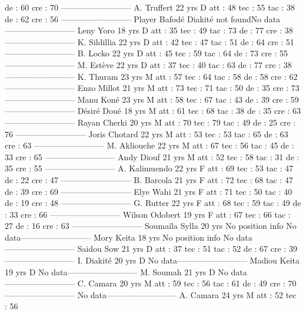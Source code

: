  de : 60 
 cre : 70 
--------------------------
A. Truffert  22 yrs 
D 
 att : 48 
 tec : 55 
 tac : 38 
 de : 62 
 cre : 56 
--------------------------
Player Bafodé Diakité not foundNo data--------------------------
Leny Yoro  18 yrs 
D 
 att : 35 
 tec : 49 
 tac : 73 
 de : 77 
 cre : 38 
--------------------------
K. Sildillia  22 yrs 
D 
 att : 42 
 tec : 47 
 tac : 51 
 de : 64 
 cre : 51 
--------------------------
B. Locko  22 yrs 
D 
 att : 45 
 tec : 59 
 tac : 64 
 de : 73 
 cre : 55 
--------------------------
M. Estève  22 yrs 
D 
 att : 37 
 tec : 40 
 tac : 63 
 de : 77 
 cre : 38 
--------------------------
K. Thuram  23 yrs 
M 
 att : 57 
 tec : 64 
 tac : 58 
 de : 58 
 cre : 62 
--------------------------
Enzo Millot  21 yrs 
M 
 att : 73 
 tec : 71 
 tac : 50 
 de : 35 
 cre : 73 
--------------------------
Manu Koné  23 yrs 
M 
 att : 58 
 tec : 67 
 tac : 43 
 de : 39 
 cre : 59 
--------------------------
Désiré Doué  18 yrs 
M 
 att : 61 
 tec : 68 
 tac : 38 
 de : 35 
 cre : 63 
--------------------------
Rayan Cherki  20 yrs 
M 
 att : 70 
 tec : 79 
 tac : 49 
 de : 25 
 cre : 76 
--------------------------
Joris Chotard  22 yrs 
M 
 att : 53 
 tec : 53 
 tac : 65 
 de : 63 
 cre : 63 
--------------------------
M. Akliouche  22 yrs 
M 
 att : 67 
 tec : 56 
 tac : 45 
 de : 33 
 cre : 65 
--------------------------
Andy Diouf  21 yrs 
M 
 att : 52 
 tec : 58 
 tac : 31 
 de : 35 
 cre : 55 
--------------------------
A. Kalimuendo  22 yrs 
F 
 att : 69 
 tec : 53 
 tac : 47 
 de : 22 
 cre : 47 
--------------------------
B. Barcola  21 yrs 
F 
 att : 72 
 tec : 68 
 tac : 47 
 de : 39 
 cre : 69 
--------------------------
Elye Wahi  21 yrs 
F 
 att : 71 
 tec : 50 
 tac : 40 
 de : 19 
 cre : 48 
--------------------------
G. Rutter  22 yrs 
F 
 att : 68 
 tec : 59 
 tac : 49 
 de : 33 
 cre : 66 
--------------------------
Wilson Odobert  19 yrs 
F 
 att : 67 
 tec : 66 
 tac : 27 
 de : 16 
 cre : 63 
--------------------------
Soumaïla Sylla  20 yrs 
No position info 
No data--------------------------
Mory Keita  18 yrs 
No position info 
No data--------------------------
Saidou Sow  21 yrs 
D 
 att : 37 
 tec : 51 
 tac : 52 
 de : 67 
 cre : 39 
--------------------------
I. Diakité  20 yrs 
D 
No data--------------------------
Madiou Keita  19 yrs 
D 
No data--------------------------
M. Soumah  21 yrs 
D 
No data--------------------------
C. Camara  20 yrs 
M 
 att : 59 
 tec : 56 
 tac : 61 
 de : 49 
 cre : 70 
--------------------------
No data--------------------------
A. Camara  24 yrs 
M 
 att : 52 
 tec : 56 
